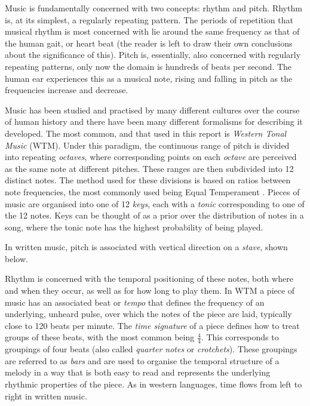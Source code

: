 \documentclass[bsc,singlespacing,logo, parskip, deptreport]{infthesis}
\begin{document}
Music is fundamentally concerned with two concepts: rhythm and pitch. Rhythm is, at its simplest, a regularly repeating pattern. The periods of repetition that musical rhythm is most concerned with lie around the same frequency as that of the human gait, or heart beat (the reader is left to draw their own conclusions about the significance of this). Pitch is, essentially, also concerned with regularly repeating patterns, only now the domain is hundreds of beats per second. The human ear experiences this as a musical note, rising and falling in pitch as the frequencies increase and decrease.

Music has been studied and practised by many different cultures over the course of human history and there have been many different formalisms for describing it developed. The most common, and that used in this report is {\em Western Tonal Music} (WTM). Under this paradigm, the continuous range of pitch is divided into repeating {\em octaves}, where corresponding points on each {\em octave} are perceived as the same note at different pitches. These ranges are then subdivided into 12 distinct notes. The method used for these divisions is based on ratios between note frequencies, the most commonly used being Equal Temperament \cite{regener1973pitch}. Pieces of music are organised into one of 12 {\em keys}, each with a {\em tonic} corresponding to one of the 12 notes. Keys can be thought of as a prior over the distribution of notes in a song, where the tonic note has the highest probability of being played.

In written music, pitch is associated with vertical direction on a {\em stave}, shown below.
\begin{center}
\end{center}

Rhythm is concerned with the temporal positioning of these notes, both where and when they occur, as well as for how long to play them. In WTM a piece of music has an associated beat or {\em tempo} that defines the frequency of an underlying, unheard pulse, over which the notes of the piece are laid, typically close to 120 beats per minute. The {\em time signature} of a piece defines how to treat groups of these beats, with the most common being $\frac{4}{4}$. This corresponds to groupings of four beats (also called {\em quarter notes} or {\em crotchets}). These groupings are referred to as {\em bars} and are used to organise the temporal structure of a melody in a way that is both easy to read and represents the underlying rhythmic properties of the piece. As in western languages, time flows from left to right in written music.
\end{document}
